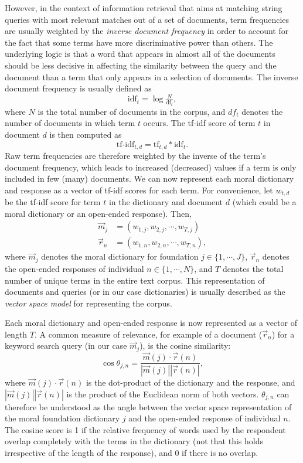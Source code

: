 \documentclass[12pt]{article}
\begin{document}
However, in the context of information retrieval that aims at matching string queries with most relevant matches out of a set of documents, term frequencies are usually weighted by the \textit{inverse document frequency} in order to account for the fact that some terms have more discriminative power than others. The underlying logic is that a word that appears in almost all of the documents should be less decisive in affecting the similarity between the query and the document than a term that only appears in a selection of documents. The inverse document frequency is usually defined as
\begin{equation}
\text{idf}_t = \log \tfrac{N}{\text{df}_t},
\end{equation}
where $N$ is the total number of documents in the corpus, and $df_t$ denotes the number of documents in which term $t$ occurs. The tf-idf score of term $t$ in document $d$ is then computed as
\begin{equation}
\text{tf-idf}_{t,d} = \text{tf}_{t,d} * \text{idf}_t.
\end{equation}
Raw term frequencies are therefore weighted by the inverse of the term's document frequency, which leads to increased (decreased) values if a term is only included in few (many) documents. We can now represent each moral dictionary and response as a vector of tf-idf scores for each term. For convenience, let $w_{t,d}$ be the tf-idf score for term $t$ in the dictionary and document $d$ (which could be a moral dictionary or an open-ended response). Then,
\begin{align}
\vec{m}_j &= \left(w_{1,j},w_{2,j},\cdots, w_{T,j}\right) \\
\vec{r}_n &= \left(w_{1,n},w_{2,n},\cdots, w_{T,n}\right),
\end{align}
where $\vec{m}_j$ denotes the moral dictionary for foundation $j\in\{1,\cdots,J\}$, $\vec{r}_n$ denotes the open-ended responses of individual $n\in\{1,\cdots,N\}$, and $T$ denotes the total number of unique terms in the entire text corpus. This representation of documents and queries (or in our case dictionaries) is usually described as the \textit{vector space model} for representing the corpus.

Each moral dictionary and open-ended response is now represented as a vector of length $T$. A common measure of relevance, for example of a document ($\vec{r}_n$) for a keyword search query (in our case $\vec{m}_j$), is the cosine similarity:
\begin{equation}
\cos\theta_{j,n}=\dfrac{\vec{m}(j)\cdotp\vec{r}(n)}{|\vec{m}(j)||\vec{r}(n)|},
\end{equation}
where $\vec{m}(j)\cdotp\vec{r}(n)$ is the dot-product of the dictionary and the response, and $|\vec{m}(j)||\vec{r}(n)|$ is the product of the Euclidean norm of both vectors. $\theta_{j,n}$ can therefore be understood as the angle between the vector space representation of the moral foundation dictionary $j$ and the open-ended response of individual $n$. The cosine score is 1 if the relative frequency of words used by the respondent overlap completely with the terms in the dictionary (not that this holds irrespective of the length of the response), and 0 if there is no overlap.
\end{document}
